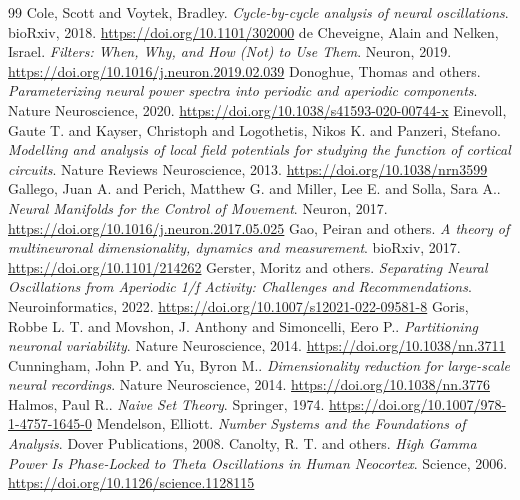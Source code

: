 \begin{thebibliography}{99}
 Cole, Scott and Voytek, Bradley. \emph{Cycle-by-cycle analysis of neural oscillations}. bioRxiv, 2018. \url{https://doi.org/10.1101/302000}
 de Cheveigne, Alain and Nelken, Israel. \emph{Filters: When, Why, and How (Not) to Use Them}. Neuron, 2019. \url{https://doi.org/10.1016/j.neuron.2019.02.039}
 Donoghue, Thomas and others. \emph{Parameterizing neural power spectra into periodic and aperiodic components}. Nature Neuroscience, 2020. \url{https://doi.org/10.1038/s41593-020-00744-x}
 Einevoll, Gaute T. and Kayser, Christoph and Logothetis, Nikos K. and Panzeri, Stefano. \emph{Modelling and analysis of local field potentials for studying the function of cortical circuits}. Nature Reviews Neuroscience, 2013. \url{https://doi.org/10.1038/nrn3599}
 Gallego, Juan A. and Perich, Matthew G. and Miller, Lee E. and Solla, Sara A.. \emph{Neural Manifolds for the Control of Movement}. Neuron, 2017. \url{https://doi.org/10.1016/j.neuron.2017.05.025}
 Gao, Peiran and others. \emph{A theory of multineuronal dimensionality, dynamics and measurement}. bioRxiv, 2017. \url{https://doi.org/10.1101/214262}
 Gerster, Moritz and others. \emph{Separating Neural Oscillations from Aperiodic 1/f Activity: Challenges and Recommendations}. Neuroinformatics, 2022. \url{https://doi.org/10.1007/s12021-022-09581-8}
 Goris, Robbe L. T. and Movshon, J. Anthony and Simoncelli, Eero P.. \emph{Partitioning neuronal variability}. Nature Neuroscience, 2014. \url{https://doi.org/10.1038/nn.3711}
 Cunningham, John P. and Yu, Byron M.. \emph{Dimensionality reduction for large-scale neural recordings}. Nature Neuroscience, 2014. \url{https://doi.org/10.1038/nn.3776}
 Halmos, Paul R.. \emph{Naive Set Theory}. Springer, 1974. \url{https://doi.org/10.1007/978-1-4757-1645-0}
 Mendelson, Elliott. \emph{Number Systems and the Foundations of Analysis}. Dover Publications, 2008.
 Canolty, R. T. and others. \emph{High Gamma Power Is Phase-Locked to Theta Oscillations in Human Neocortex}. Science, 2006. \url{https://doi.org/10.1126/science.1128115}
\end{thebibliography}
